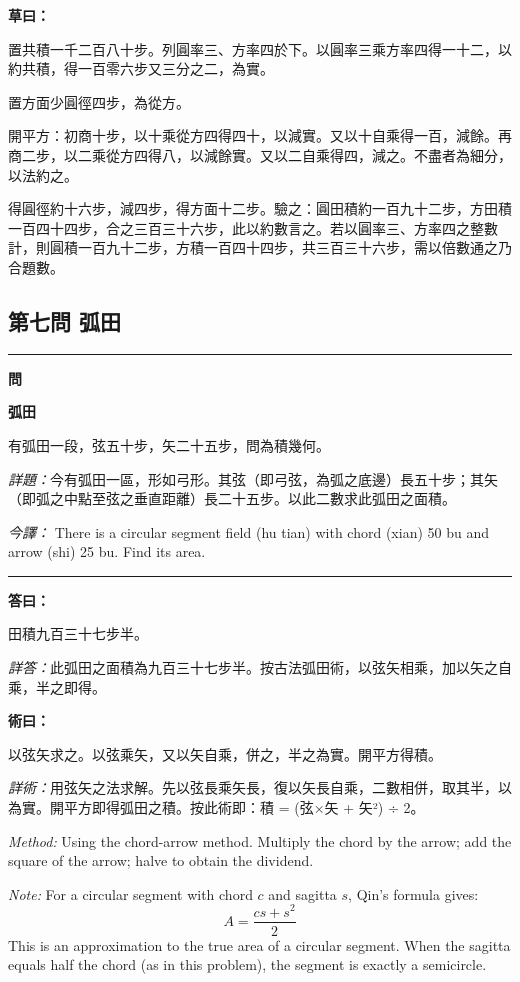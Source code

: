 \documentclass[11pt,a4paper]{article}
\newenvironment{problem}[1][]{%
  \medskip\noindent\rule{\textwidth}{0.4pt}%
  \par\noindent\textbf{\color{sectioncolor}#1}\par\nopagebreak%
  \smallskip%
}{%
  \par\noindent\rule{\textwidth}{0.4pt}\medskip%
}
\newenvironment{answer}{%
  \medskip\noindent{\color{answercolor}\rule{0.5\textwidth}{0.5pt}}%
  \par\color{answercolor}%
}{%
  \par\medskip%
}
\newenvironment{method}{%
  \medskip\noindent{\color{methodcolor}\rule{0.5\textwidth}{0.5pt}}%
  \par\color{methodcolor}%
}{%
  \par\medskip%
}
\newenvironment{calculation}{%
  \medskip\noindent{\color{caocolor}\rule{0.4\textwidth}{0.4pt}}%
  \par\color{caocolor}%
}{%
  \par\medskip%
}
\begin{document}
\begin{calculation}
\textbf{草曰：}

置共積一千二百八十步。列圓率三、方率四於下。以圓率三乘方率四得一十二，以約共積，得一百零六步又三分之二，為實。

置方面少圓徑四步，為從方。

開平方：初商十步，以十乘從方四得四十，以減實。又以十自乘得一百，減餘。再商二步，以二乘從方四得八，以減餘實。又以二自乘得四，減之。不盡者為細分，以法約之。

得圓徑約十六步，減四步，得方面十二步。驗之：圓田積約一百九十二步，方田積一百四十四步，合之三百三十六步，此以約數言之。若以圓率三、方率四之整數計，則圓積一百九十二步，方積一百四十四步，共三百三十六步，需以倍數通之乃合題數。
\end{calculation}

\subsection*{第七問 弧田}

\begin{problem}[\textbf{問}]
\textbf{\color{sectioncolor}弧田}

有弧田一段，弦五十步，矢二十五步，問為積幾何。

\medskip
\textit{詳題：}今有弧田一區，形如弓形。其弦（即弓弦，為弧之底邊）長五十步；其矢（即弧之中點至弦之垂直距離）長二十五步。以此二數求此弧田之面積。

\medskip
\textit{今譯：} There is a circular segment field (hu tian) with chord (xian) 50 bu and arrow (shi) 25 bu. Find its area.
\end{problem}

\begin{answer}
\textbf{答曰：}

田積九百三十七步半。

\medskip
\textit{詳答：}此弧田之面積為九百三十七步半。按古法弧田術，以弦矢相乘，加以矢之自乘，半之即得。
\end{answer}

\begin{method}
\textbf{術曰：}

以弦矢求之。以弦乘矢，又以矢自乘，併之，半之為實。開平方得積。

\medskip
\textit{詳術：}用弦矢之法求解。先以弦長乘矢長，復以矢長自乘，二數相併，取其半，以為實。開平方即得弧田之積。按此術即：積 = (弦×矢 + 矢²) ÷ 2。

\medskip
\textit{Method:} Using the chord-arrow method. Multiply the chord by the arrow; add the square of the arrow; halve to obtain the dividend.

\medskip
\textit{Note:} For a circular segment with chord $c$ and sagitta $s$, Qin's formula gives:
\[
A = \frac{cs + s^2}{2}
\]
This is an approximation to the true area of a circular segment. When the sagitta equals half the chord (as in this problem), the segment is exactly a semicircle.
\end{method}
\end{document}
